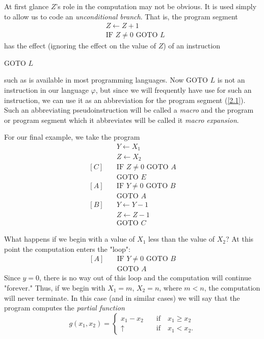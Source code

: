 \documentclass[a4paper,10pt,twoside]{book}
\begin{document}
At first glance $Z$'s role in the computation may not be obvious. It is used simply to allow us to code an \textit{unconditional branch}. That is, the program segment
\begin{equation}
    \begin{aligned}&Z\leftarrow Z+1\\&\text{IF }Z\neq 0\text{ GOTO }L\end{aligned}
    \label{2.1}
\end{equation}
has the effect (ignoring the effect on the value of $Z$) of an instruction
\begin{center}
    GOTO $L$
\end{center}
such as is available in most programming languages. Now GOTO $L$ is not an instruction in our language $\varphi$, but since we will frequently have use for such an instruction, we can use it as an abbreviation for the program segment (\ref{2.1}). Such an abbreviating pseudoinstruction will be called a \textit{macro} and the program or program segment which it abbreviates will be called it \textit{macro expansion}.

For our final example, we take the program
\begin{equation*}
    \begin{aligned}&Y\leftarrow X_{1}\\ &Z\leftarrow X_{2}\\ [C]\quad&\text{IF }Z\neq0\text{ GOTO }A\\ &\text{GOTO }E\\ [A]\quad&\text{IF }Y\neq0\text{ GOTO }B\\ &\text{GOTO }A\\ [B]\quad&Y\leftarrow Y-1\\ &Z\leftarrow Z-1\\ &\text{GOTO }C\end{aligned}
\end{equation*}

What happens if we begin with a value of $X_1$ less than the value of $X_2$? At this point the computation enters the "loop":
\begin{equation*}
    \begin{aligned}[A]\quad&\text{IF }Y\neq 0\text{ GOTO }B\\&\text{GOTO }A\end{aligned}
\end{equation*}
Since $y=0$, there is no way out of this loop and the computation will continue "forever." Thus, if we begin with $X_1=m$, $X_2=n$, where $m<n$, the computation will never terminate. In this case (and in similar cases) we will say that the program computes the \textit{partial function} $$g(x_1,x_2)=\begin{cases}x_1-x_2&\quad\text{if}\quad x_1\geq x_2\\\uparrow&\quad\text{if}\quad x_1<x_2.\end{cases}$$

\end{document}
